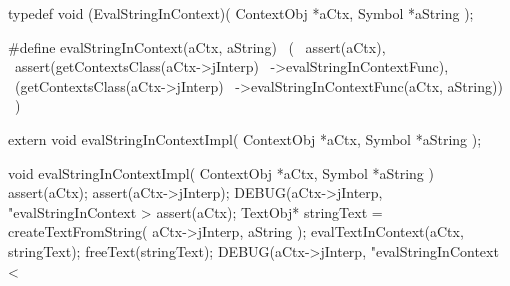 \startCHeader
typedef void (EvalStringInContext)(
  ContextObj *aCtx,
  Symbol     *aString
);

#define evalStringInContext(aCtx, aString)      \
  (                                             \
    assert(aCtx),                               \
    assert(getContextsClass(aCtx->jInterp)      \
      ->evalStringInContextFunc),               \
    (getContextsClass(aCtx->jInterp)            \
      ->evalStringInContextFunc(aCtx, aString)) \
  )
\stopCHeader

\setCHeaderStream{private}
\startCHeader
extern void evalStringInContextImpl(
  ContextObj *aCtx,
  Symbol     *aString
);
\stopCHeader
\setCHeaderStream{public}

\startCCode
void evalStringInContextImpl(
  ContextObj *aCtx,
  Symbol     *aString
) {
  assert(aCtx);
  assert(aCtx->jInterp);
  DEBUG(aCtx->jInterp, "evalStringInContext > %
  assert(aCtx);
  TextObj* stringText =
    createTextFromString(
      aCtx->jInterp,
      aString
    );
  evalTextInContext(aCtx, stringText);
  freeText(stringText);
  DEBUG(aCtx->jInterp, "evalStringInContext < %
}
\stopCCode